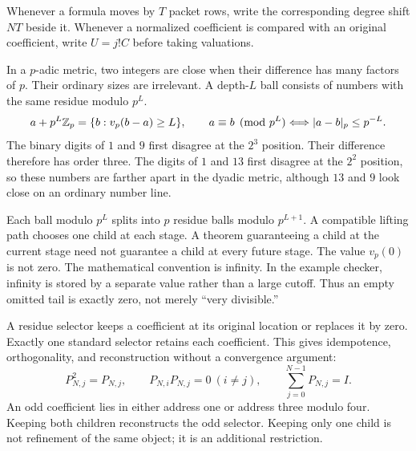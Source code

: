 Whenever a formula moves by $T$ packet rows, write the corresponding degree shift $NT$ beside it. Whenever a normalized coefficient is compared with an original coefficient, write $U=j!C$ before taking valuations.

In a $p$-adic metric, two integers are close when their difference has many factors of $p$. Their ordinary sizes are irrelevant. A depth-$L$ ball consists of numbers with the same residue modulo $p^L$.
\[
 a+p^L\mathbb Z_p=\{b:v_p(b-a)\ge L\},\qquad
 a\equiv b\pmod{p^L}\Longleftrightarrow |a-b|_p\le p^{-L}.
\]
The binary digits of $1$ and $9$ first disagree at the $2^3$ position. Their difference therefore has order three. The digits of $1$ and $13$ first disagree at the $2^2$ position, so these numbers are farther apart in the dyadic metric, although $13$ and $9$ look close on an ordinary number line.

Each ball modulo $p^L$ splits into $p$ residue balls modulo $p^{L+1}$. A compatible lifting path chooses one child at each stage. A theorem guaranteeing a child at the current stage need not guarantee a child at every future stage.
The value $v_p(0)$ is not zero. The mathematical convention is infinity. In the example checker, infinity is stored by a separate value rather than a large cutoff. Thus an empty omitted tail is exactly zero, not merely ``very divisible.''

A residue selector keeps a coefficient at its original location or replaces it by zero. Exactly one standard selector retains each coefficient. This gives idempotence, orthogonality, and reconstruction without a convergence argument:
\[
 P_{N,j}^2=P_{N,j},\qquad P_{N,i}P_{N,j}=0\ (i\ne j),
 \qquad\sum_{j=0}^{N-1}P_{N,j}=I.
\]
An odd coefficient lies in either address one or address three modulo four. Keeping both children reconstructs the odd selector. Keeping only one child is not refinement of the same object; it is an additional restriction.


